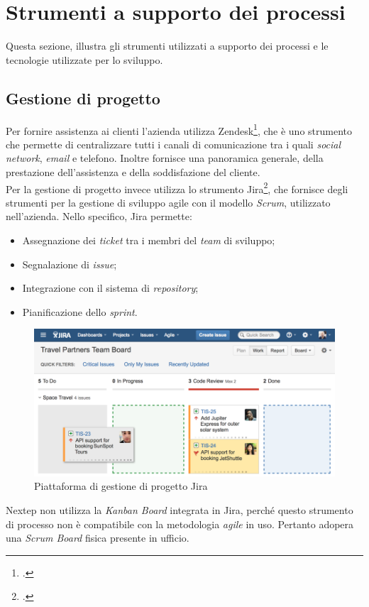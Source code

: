 \section{Strumenti a supporto dei processi}
Questa sezione, illustra gli strumenti utilizzati a supporto dei processi e le tecnologie utilizzate per lo sviluppo.
\subsection{Gestione di progetto}
Per fornire assistenza ai clienti l'azienda utilizza Zendesk\footcite{https://www.zendesk.it/}, che è uno strumento che permette di centralizzare tutti i canali di comunicazione tra i quali \emph{social network}, \emph{email} e telefono. Inoltre fornisce una panoramica generale, della prestazione dell'assistenza e della soddisfazione del cliente.\\Per la gestione di progetto invece utilizza lo strumento Jira\footcite{https://www.atlassian.com/software/jira}, che fornisce degli strumenti per la gestione di sviluppo agile con il modello \emph{Scrum}, utilizzato nell'azienda. Nello specifico, Jira permette:
\begin{itemize}
\item Assegnazione dei \emph{ticket} tra i membri del \emph{team} di sviluppo;
\item Segnalazione di \emph{issue};
\item Integrazione con il sistema di \emph{repository};
\item Pianificazione dello \emph{sprint}.
\end{itemize}
\begin{figure}[h]
\centering
\includegraphics[scale=0.4]{immagini/jira}
\caption{Piattaforma di gestione di progetto Jira}
\label{fig:jira}
\end{figure}
Nextep non utilizza la \emph{Kanban Board} integrata in Jira, perché questo strumento di processo non è compatibile con la metodologia \emph{agile} in uso. Pertanto adopera una \emph{Scrum Board} fisica presente in ufficio.
\newpage
